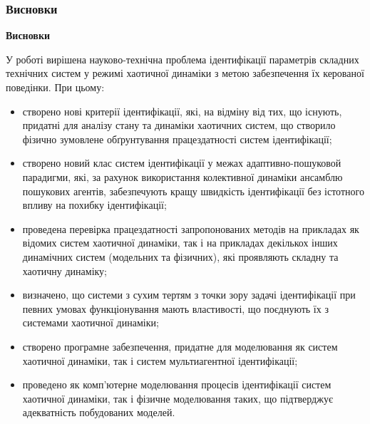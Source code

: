 \documentclass[14pt,handout,utf8]{beamer}
\newcommand{\Xhead}[1]{
 \begin{center}%
      \textbf{#1}%
 \end{center}%
}
\begin{document}
\begin{frame}
  \frametitle{Висновки}

  \Xhead{Висновки}

У роботі вирішена науково-технічна проблема ідентифікації параметрів складних технічних
систем у режимі хаотичної динаміки
з метою забезпечення їх керованої поведінки. При цьому:

\begin{itemize}

  \item
    створено нові критерії ідентифікації, які, на відміну від тих, що
    існують, придатні для аналізу стану та динаміки
    хаотичних систем, що створило фізично зумовлене обґрунтування працездатності систем
    ідентифікації;

  \item
    створено новий клас систем ідентифікації у межах
    адаптивно-пошуковой парадигми,
    які, за рахунок використання колективної динаміки
    ансамблю пошукових агентів, забезпечують
    кращу швидкість ідентифікації без істотного впливу на похибку ідентифікації;

  \item
    проведена перевірка працездатності запропонованих методів
    на прикладах як відомих систем хаотичної динаміки,
    так і на прикладах декількох інших динамічних систем (модельних та фізичних),
    які проявляють складну та хаотичну динаміку;

  \item
   визначено, що системи з сухим тертям з точки зору задачі ідентифікації
   при певних  умовах функціонування
   мають властивості, що поєднують їх з системами хаотичної динаміки;

 \item
  створено програмне забезпечення, придатне для моделювання як систем
  хаотичної динаміки, так і систем мультиагентної ідентифікації;

  \item
  проведено як комп'ютерне моделювання процесів ідентифікації систем
  хаотичної динаміки, так і фізичне моделювання таких, що підтверджує адекватність
  побудованих моделей.


\end{itemize}

\end{frame}



%
%
%
\end{document}
